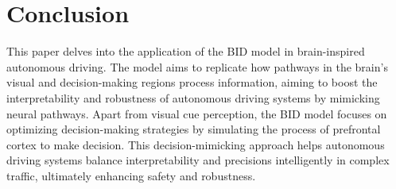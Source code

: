 \section{Conclusion}
\label{sec:conclusion}
\hspace{1pc}This paper delves into the application of the BID model in brain-inspired autonomous driving. 
The model aims to replicate how pathways in the brain's visual and decision-making regions process information, aiming to boost the interpretability and robustness of autonomous driving systems by mimicking neural pathways. 
Apart from visual cue perception, the BID model focuses on optimizing decision-making strategies by simulating the process of prefrontal cortex to make decision. 
This decision-mimicking approach helps autonomous driving systems balance interpretability and precisions intelligently in complex traffic, ultimately enhancing safety and robustness.